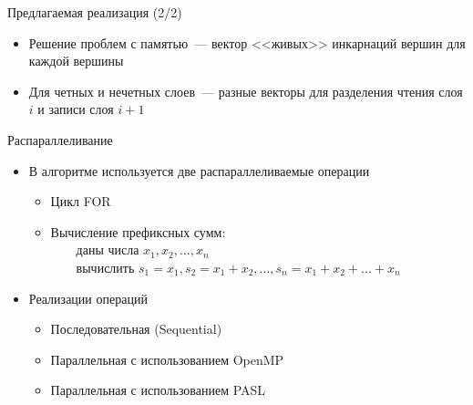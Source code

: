 \documentclass[hyperref=unicode,graphics=pdflatex,13pt]{beamer}
\begin{document}
\begin{frame}[shrink]{Предлагаемая реализация (2/2)}
\begin{itemize}
    \item Решение проблем с памятью~--- вектор <<живых>> инкарнаций вершин для каждой вершины
    \item Для четных и нечетных слоев~--- разные векторы для разделения чтения слоя $i$ и записи слоя $i+1$
\end{itemize}
\begin{center}
\end{center}
\end{frame}

\begin{frame}[shrink]{Распараллеливание}
\begin{itemize}
    \item В алгоритме используется две распараллеливаемые операции
        \begin{itemize}
            \item Цикл FOR
            \item Вычисление префиксных сумм:
                  \\~~~~даны числа $x_{1}, x_{2}, ..., x_{n}$
                  \\~~~~вычислить $s_{1}=x_{1}, s_{2}=x_{1}+x_{2}, ..., s_{n}=x_{1}+x_{2}+...+x_{n}$
        \end{itemize}
    \item Реализации операций
        \begin{itemize}
            \item Последовательная (Sequential)
            \item Параллельная с использованием OpenMP
            \item Параллельная с использованием PASL
        \end{itemize}
\end{itemize}
\end{frame}
\end{document}
